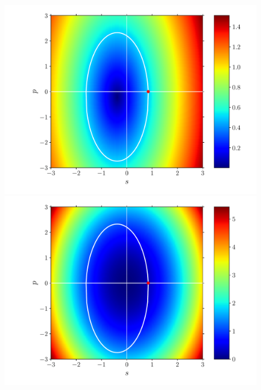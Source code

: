 \documentclass[fleqn]{goose-article}
\begin{document}
\begin{figure}[htp]
    \\
    \begin{minipage}[t]{.31\textwidth}
        \centering
        \includegraphics[width=\textwidth]{example_prestress_phase-diagram_eps.pdf}
        \subcaption{$\varepsilon$}
    \end{minipage}
    \hfill
    \begin{minipage}[t]{.31\textwidth}
        \centering
        \includegraphics[width=\textwidth]{example_prestress_phase-diagram_energy.pdf}
    \end{minipage}
    \hfill
    \begin{minipage}[t]{.31\textwidth}
        \centering

\end{minipage}
\end{figure}
\end{document}
